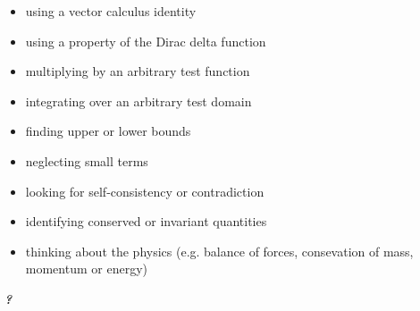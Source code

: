 \documentclass[10pt, a4paper]{article}
\begin{document}
\begin{itemize}
\item[$\nabla$~~] using a vector calculus identity

\item[$\delta$~~] using a property of the Dirac delta function

\item[$v$~~] multiplying by an arbitrary test function 

\item[$\Omega$~~] integrating over an arbitrary test domain

\item[$\lessgtr$~~] finding upper or lower bounds

\item[$+\dots$~~] neglecting small terms

\item[$\checkmark$~~] looking for self-consistency or contradiction

\item[$C$~~] identifying conserved or invariant quantities

\item[] thinking about the physics (e.g. balance of forces, consevation of mass, momentum or energy)
	
\end{itemize}

\vspace{15pt}
\hfill\textbf{\textit{?}}
\end{document}
